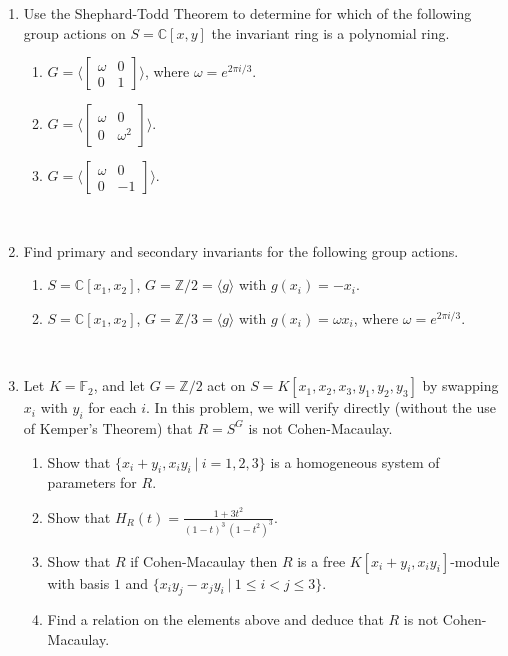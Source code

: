 \documentclass[12pt]{amsart}
\theoremstyle{definition}
\numberwithin{equation}{theorem}
\def\CC{\mathbb{C}}
\def\FF{\mathbb{F}}
\def\ZZ{\mathbb{Z}}
\begin{document}
\begin{enumerate}

\item Use the Shephard-Todd Theorem to determine for which of the following group actions on $S=\CC[x,y]$ the invariant ring is a polynomial ring.
\begin{enumerate}
\item  $G=\langle \begin{bmatrix} \omega & 0 \\ 0 & 1 \end{bmatrix} \rangle$, where $\omega=e^{2\pi i / 3}$.
\item $G=\langle \begin{bmatrix} \omega & 0 \\ 0 & \omega^2 \end{bmatrix} \rangle$.
\item $G=\langle \begin{bmatrix} \omega & 0 \\ 0 & -1 \end{bmatrix} \rangle$.
\end{enumerate}

\

\item Find primary and secondary invariants for the following group actions.
\begin{enumerate}
\item $S=\CC[x_1,x_2]$, $G=\ZZ/2 = \langle g \rangle$ with $g(x_i) = -x_i$.
\item $S=\CC[x_1,x_2]$, $G=\ZZ/3 = \langle g \rangle$ with $g(x_i) = \omega x_i$, where $\omega=e^{2\pi i / 3}$.
\end{enumerate}

\



\item Let $K=\FF_2$, and let $G=\ZZ/2$ act on $S=K[x_1,x_2,x_3,y_1,y_2,y_3]$ by swapping $x_i$ with $y_i$ for each $i$. In this problem, we will verify directly (without the use of Kemper's Theorem) that $R=S^G$ is not Cohen-Macaulay.
\begin{enumerate}
\item Show that $\{ x_i + y_i, x_i y_i \ | \ i =1,2,3\}$ is a homogeneous system of parameters for $R$. 
\item Show that $H_R(t) = \frac{ 1 + 3t^2}{(1-t)^3 \, (1-t^2)^3}$.
\item Show that $R$ if Cohen-Macaulay then $R$ is a free $K[ x_i + y_i, x_i y_i]$-module with basis $1$ and $\{ x_i y_j - x_j y_i \ | \ 1\leq i < j \leq 3\}$.
\item Find a relation on the elements above and deduce that $R$ is not Cohen-Macaulay.
\end{enumerate}


\end{enumerate}
\end{document}
